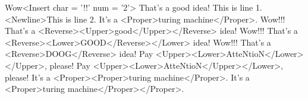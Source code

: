 Wow<Insert char = '!!' num = '2'> That's a good idea!
This is line 1.<Newline>This is line 2.
It's a <Proper>turing machine</Proper>.
Wow!!! That's a <Reverse><Upper>good</Upper></Reverse> idea!
Wow!!! That's a <Reverse><Lower>GOOD</Reverse></Lower> idea!
Wow!!! That's a <Reverse>DOOG</Reverse> idea!
Pay <Upper><Lower>AtteNtioN</Lower></Upper>, please!
Pay <Upper><Lower>AtteNtioN</Upper></Lower>, please!
It's a <Proper><Proper>turing machine</Proper>.
It's a <Proper>turing machine</Proper></Proper>.
